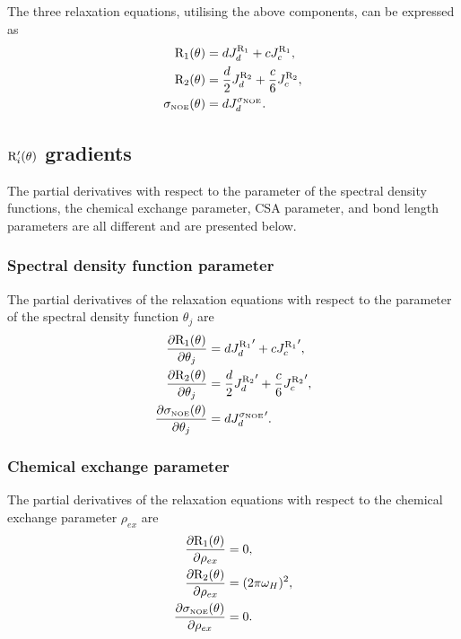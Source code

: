 The three relaxation equations, utilising the above components, can be expressed as
\begin{align}
    \mathrm{R}_1(\theta) & = d J_d^{\mathrm{R}_1} + c J_c^{\mathrm{R}_1},                          \label{eq: Ri': R1} \\
    \mathrm{R}_2(\theta) & = \frac{d}{2} J_d^{\mathrm{R}_2} + \frac{c}{6} J_c^{\mathrm{R}_2},      \label{eq: Ri': R2} \\
    \sigma_{\scriptscriptstyle \mathrm{NOE}}(\theta) & = d J_d^{\sigma_{\scriptscriptstyle \mathrm{NOE}}}.                          \label{eq: Ri': sigmaNOE}
\end{align}




\subsection{$\mathrm{R}_i'(\theta)$ gradients}

The partial derivatives with respect to the parameter of the spectral density functions, the chemical exchange parameter, CSA parameter, and bond length parameters are all different and are presented below.


\subsubsection{Spectral density function parameter}

The partial derivatives of the relaxation equations with respect to the parameter of the spectral density function $\theta_j$ are
\begin{align}
    \frac{\partial \mathrm{R}_1(\theta)}{\partial \theta_j} &= d {J_d^{\mathrm{R}_1}}' + c {J_c^{\mathrm{R}_1}}',                      \label{eq: Ri': dR1/dmf} \\
    \frac{\partial \mathrm{R}_2(\theta)}{\partial \theta_j} &= \frac{d}{2} {J_d^{\mathrm{R}_2}}' + \frac{c}{6} {J_c^{\mathrm{R}_2}}',  \label{eq: Ri': dR2/dmf} \\
    \frac{\partial \sigma_{\scriptscriptstyle \mathrm{NOE}}(\theta)}{\partial \theta_j} &= d {J_d^{\sigma_{\scriptscriptstyle \mathrm{NOE}}}}'.                         \label{eq: Ri': dsigmaNOE/dmf}
\end{align}


\subsubsection{Chemical exchange parameter}

The partial derivatives of the relaxation equations with respect to the chemical exchange parameter $\rho_{ex}$ are
\begin{align}
    \frac{\partial \mathrm{R}_1(\theta)}{\partial \rho_{ex}} &= 0,          \label{eq: Ri': dR1/dRex} \\
    \frac{\partial \mathrm{R}_2(\theta)}{\partial \rho_{ex}} &= (2 \pi \omega_H)^2,          \label{eq: Ri': dR2/dRex} \\
    \frac{\partial \sigma_{\scriptscriptstyle \mathrm{NOE}}(\theta)}{\partial \rho_{ex}} &= 0.   \label{eq: Ri': dsigmaNOE/dRex}
\end{align}


